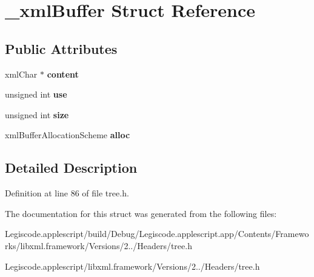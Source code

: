 \hypertarget{struct__xml_buffer}{\section{\-\_\-xml\-Buffer Struct Reference}
\label{struct__xml_buffer}
}
\subsection*{Public Attributes}
\begin{DoxyCompactItemize}
\item 
\hypertarget{struct__xml_buffer_a44d91a1073f8b07bc55196bf656ce2fa}{xml\-Char $\ast$ {\bfseries content}}\label{struct__xml_buffer_a44d91a1073f8b07bc55196bf656ce2fa}

\item 
\hypertarget{struct__xml_buffer_aaf67415a2fbcd5030c7d3f828b735ad6}{unsigned int {\bfseries use}}\label{struct__xml_buffer_aaf67415a2fbcd5030c7d3f828b735ad6}

\item 
\hypertarget{struct__xml_buffer_a9729e805b7736692f496eefac6103210}{unsigned int {\bfseries size}}\label{struct__xml_buffer_a9729e805b7736692f496eefac6103210}

\item 
\hypertarget{struct__xml_buffer_acac8aee322443ed7a9d0854ee5a87b02}{xml\-Buffer\-Allocation\-Scheme {\bfseries alloc}}\label{struct__xml_buffer_acac8aee322443ed7a9d0854ee5a87b02}

\end{DoxyCompactItemize}


\subsection{Detailed Description}


Definition at line 86 of file tree.\-h.



The documentation for this struct was generated from the following files\-:\begin{DoxyCompactItemize}
\item 
Legiscode.\-applescript/build/\-Debug/\-Legiscode.\-applescript.\-app/\-Contents/\-Frameworks/libxml.\-framework/\-Versions/2../\-Headers/tree.\-h\item 
Legiscode.\-applescript/libxml.\-framework/\-Versions/2../\-Headers/tree.\-h\end{DoxyCompactItemize}
